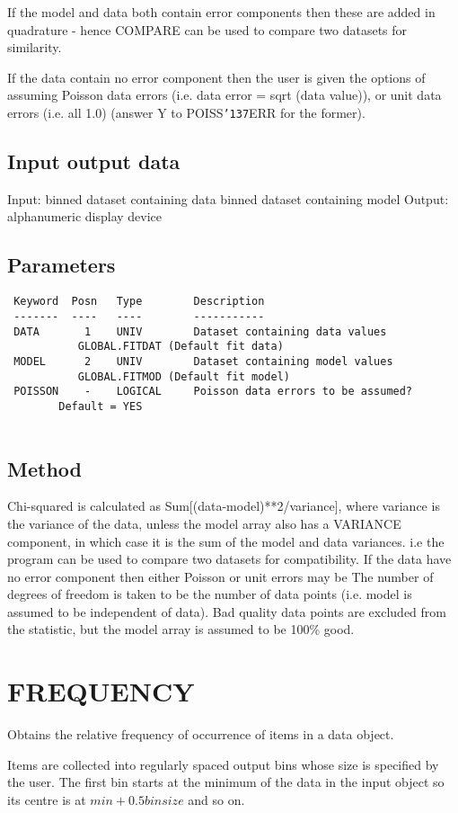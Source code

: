 \documentclass{book}
\renewcommand{\_}{{\tt\char'137}}     %
\begin{document}
If the model and data both contain error components then these
are added in quadrature - hence COMPARE can be used to compare
two datasets for similarity.
 
If the data contain no error component then the user is given the
options of assuming Poisson data errors (i.e. data error = sqrt
(data value)), or unit data errors (i.e. all 1.0) (answer Y to
POISS\_ERR for the former).
 
\subsection{Input output data}
Input: binned dataset containing data
binned dataset containing model
Output: alphanumeric display device
\subsection{Parameters}
\begin{verbatim}
 Keyword  Posn   Type        Description
 -------  ----   ----        -----------
 DATA       1    UNIV        Dataset containing data values
           GLOBAL.FITDAT (Default fit data)
 MODEL      2    UNIV        Dataset containing model values
           GLOBAL.FITMOD (Default fit model)
 POISSON    -    LOGICAL     Poisson data errors to be assumed?
        Default = YES
 
\end{verbatim}\subsection{Method}
Chi-squared is calculated as Sum[(data-model)**2/variance], where
variance is the variance of the data, unless the model array also
has a VARIANCE component, in which case it is the sum of the
model and data variances. i.e the program can be used to compare
two datasets for compatibility. If the data have no error
component then either Poisson or unit errors may be The number of
degrees of freedom is taken to be the number of data points (i.e.
model is assumed to be independent of data). Bad quality data
points are excluded from the statistic, but the model array is
assumed to be 100\% good.
 
\section{FREQUENCY}
Obtains the relative frequency of occurrence of items in a data
object.
 
Items are collected into regularly spaced output bins whose size
is specified by the user. The first bin starts at the minimum of
the data in the input object so its centre is at
$min + 0.5 binsize$ and so on.
 
\end{document}
